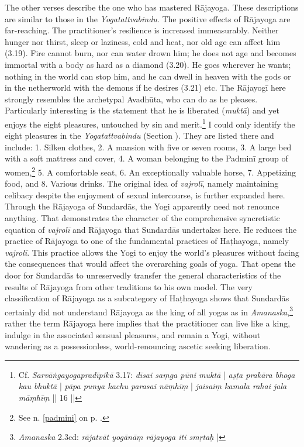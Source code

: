 The other verses describe the one who has mastered Rājayoga. These descriptions are similar to those in the \emph{Yogatattvabindu}. The positive effects of Rājayoga are far-reaching. The practitioner's resilience is increased immeasurably. Neither hunger nor thirst, sleep or laziness, cold and heat, nor old age can affect him (3.19). Fire cannot burn, nor can water drown him; he does not age and becomes immortal with a body as hard as a diamond (3.20). He goes wherever he wants; nothing in the world can stop him, and he can dwell in heaven with the gods or in the netherworld with the demons if he desires (3.21) etc. The Rājayogī here strongly resembles the archetypal Avadhūta, who can do as he pleases.
Particularly interesting is the statement that he is liberated (\textit{muktā}) and yet enjoys the eight pleasures, untouched by sin and merit.\footnote{Cf. \emph{Sarvāṅgayogapradīpikā} 3.17: \textit{dīsai saṃga pūni muktā} | \textit{aṣṭa prakāra bhoga kau bhuktā} | \textit{pāpa punya kachu parasai nāṃhīṃ} | \textit{jaisaiṃ kamala rahai jala māṃhīṃ} || 16 ||} I could only identify the eight pleasures in the \textit{Yogatattvabindu} (Section ). They are listed there and include: 1. Silken clothes, 2. A mansion with five or seven rooms, 3. A large bed with a soft mattress and cover, 4. A woman belonging to the Padminī group of women,\footnote{See n. \ref{padmini} on p. \pageref{padmini}.} 5. A comfortable seat, 6. An exceptionally valuable horse, 7. Appetizing food, and 8. Various drinks. The original idea of \textit{vajrolī}, namely maintaining celibacy despite the enjoyment of sexual intercourse, is further expanded here. Through the Rājayoga of Sundardās, the Yogi apparently need not renounce anything.
That demonstrates the character of the comprehensive syncretistic equation of \textit{vajrolī} and Rājayoga that Sundardās undertakes here. He reduces the practice of Rājayoga to one of the fundamental practices of Haṭhayoga, namely \textit{vajrolī}. This practice allows the Yogi to enjoy the world's pleasures without facing the consequences that would affect the overarching goals of yoga. That opens the door for Sundardās to unreservedly transfer the general characteristics of the results of Rājayoga from other traditions to his own model. The very classification of Rājayoga as a subcategory of Haṭhayoga shows that Sundardās certainly did not understand Rājayoga as the king of all yogas as in \textit{Amanaska},\footnote{\textit{Amanaska} 2.3cd: \textit{rājatvāt yogānāṃ rājayoga iti smṛtaḥ} |} rather the term Rājayoga here implies that the practitioner can live like a king, indulge in the associated sensual pleasures, and remain a Yogi, without wandering as a possessionless, world-renouncing ascetic seeking liberation.

